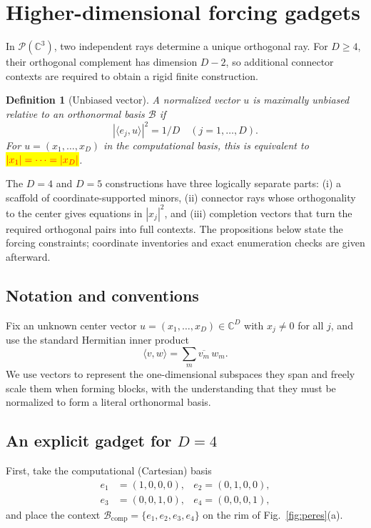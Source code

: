 \documentclass[%
  reprint,
  superscriptaddress,
  showpacs,
  showkeys,
  amsmath,amssymb,
  pra,
  longbibliography,
  floatfix,
  x11names
]{revtex4-2}
\newcommand{\rev}[1]{{\color{revisionblue}#1}}
\newenvironment{revision}{\begingroup\color{revisionblue}}{\endgroup}
\newcommand{\corrmath}[1]{\begingroup\setlength{\fboxsep}{1pt}\colorbox{yellow}{\ensuremath{\color{red}#1}}\endgroup}
\newtheorem{definition}{Definition}
\begin{document}




\section{Higher-dimensional forcing gadgets}
\label{2025-hdfg}

\begin{revision}
In $\mathcal{P}(\mathbb{C}^3)$, two independent rays determine a unique orthogonal ray.  For $D\geq4$, their orthogonal complement has dimension $D-2$, so additional connector contexts are required to obtain a rigid finite construction.

\begin{definition}[Unbiased vector]
\label{def:unbiased}
A normalized vector $u$ is maximally unbiased relative to an orthonormal basis $\mathcal{B}$ if
\[
|\langle e_j,u\rangle|^2=1/D\quad (j=1,\ldots,D).
\]
For $u=(x_1,\ldots,x_D)$ in the computational basis, this is equivalent to \corrmath{|x_1|=\cdots=|x_D|}.
\end{definition}

The $D=4$ and $D=5$ constructions have three logically separate parts: (i) a scaffold of coordinate-supported minors, (ii) connector rays whose orthogonality to the center gives equations in $|x_j|^2$, and (iii) completion vectors that turn the required orthogonal pairs into full contexts.  The propositions below state the forcing constraints; coordinate inventories and exact enumeration checks are given afterward.
\end{revision}

\subsection{Notation and conventions}
Fix an unknown center vector $u = (x_1,\dots,x_D) \in \mathbb{C}^D$ with $x_j \ne 0$ for all $j$, and use the standard Hermitian inner product
\[
\langle v,w\rangle = \sum_m \overline{v_m}\, w_m.
\]
We use vectors to represent the one-dimensional subspaces they span and freely scale them when forming blocks,
with the understanding that they must be normalized to form a literal orthonormal basis.

\subsection{An explicit gadget for $D=4$}

\rev{First, take the computational (Cartesian) basis}
\begin{align*}
e_1&=(1,0,0,0), &
e_2 =(0,1,0,0),\\
e_3&=(0,0,1,0), &
e_4 =(0,0,0,1),
\end{align*}
\rev{and place the context $\mathcal{B}_{\mathrm{comp}}=\{e_1,e_2,e_3,e_4\}$ on the rim of Fig.~\ref{fig:peres}(a).}
\end{document}

